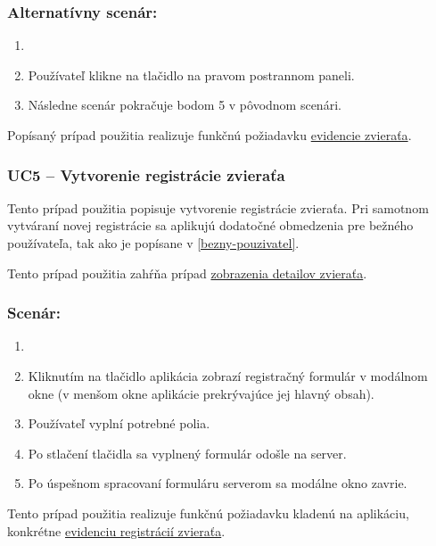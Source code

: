 \subsubsection*{Alternatívny scenár:}

\begin{enumerate}
	\item {}
	\item Používateľ klikne na tlačidlo  na pravom postrannom paneli.
	\item Následne scenár pokračuje bodom 5 v pôvodnom scenári.
\end{enumerate}

Popísaný prípad použitia realizuje funkčnú požiadavku \hyperref[evidencia-zvierat]{evidencie zvieraťa}.

\subsubsection{UC5 -- Vytvorenie registrácie zvieraťa}

Tento prípad použitia popisuje vytvorenie registrácie zvieraťa. Pri samotnom vytváraní novej registrácie sa aplikujú dodatočné obmedzenia pre bežného používateľa, tak ako je popísane v \ref{bezny-pouzivatel}.

Tento prípad použitia zahŕňa prípad \hyperref[uc2]{zobrazenia detailov zvieraťa}.

\subsubsection*{Scenár:}

\begin{enumerate}
	\item {}
	\item Kliknutím na tlačidlo  aplikácia zobrazí registračný formulár v modálnom okne (v menšom okne aplikácie prekrývajúce jej hlavný obsah).
	\item Používateľ vyplní potrebné polia.
	\item Po stlačení tlačidla  sa vyplnený formulár odošle na server.
	\item Po úspešnom spracovaní formuláru serverom sa modálne okno zavrie.
\end{enumerate}

Tento prípad použitia realizuje funkčnú požiadavku kladenú na aplikáciu, konkrétne \hyperref[evidencia-registracii-zvierata]{evidenciu registrácií zvieraťa}.

